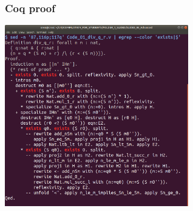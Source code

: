 
\begin{frame}

\frametitle{Coq proof}

\begin{center}
\includegraphics[width=8cm]{FOLDER_3_IMG_FILES/Code_01_div_q_r_coq_whole.png}
\end{center}

\end{frame}

